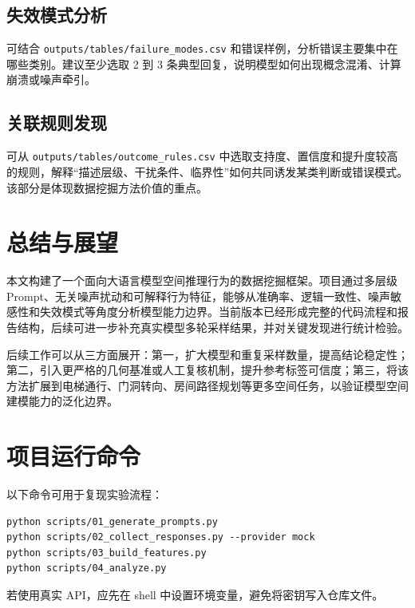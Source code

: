 \documentclass{BJUTReport}
\begin{document}
\subsection{失效模式分析}

可结合 \verb|outputs/tables/failure_modes.csv| 和错误样例，分析错误主要集中在哪些类别。建议至少选取 2 到 3 条典型回复，说明模型如何出现概念混淆、计算崩溃或噪声牵引。

\subsection{关联规则发现}

可从 \verb|outputs/tables/outcome_rules.csv| 中选取支持度、置信度和提升度较高的规则，解释“描述层级、干扰条件、临界性”如何共同诱发某类判断或错误模式。该部分是体现数据挖掘方法价值的重点。

\section{总结与展望}

本文构建了一个面向大语言模型空间推理行为的数据挖掘框架。项目通过多层级 Prompt、无关噪声扰动和可解释行为特征，能够从准确率、逻辑一致性、噪声敏感性和失效模式等角度分析模型能力边界。当前版本已经形成完整的代码流程和报告结构，后续可进一步补充真实模型多轮采样结果，并对关键发现进行统计检验。

后续工作可以从三方面展开：第一，扩大模型和重复采样数量，提高结论稳定性；第二，引入更严格的几何基准或人工复核机制，提升参考标签可信度；第三，将该方法扩展到电梯通行、门洞转向、房间路径规划等更多空间任务，以验证模型空间建模能力的泛化边界。

\clearpage{}

\nocite{*}

\appendix
{}

\section{项目运行命令}

以下命令可用于复现实验流程：

\begin{lstlisting}
python scripts/01_generate_prompts.py
python scripts/02_collect_responses.py --provider mock
python scripts/03_build_features.py
python scripts/04_analyze.py
\end{lstlisting}

若使用真实 API，应先在 shell 中设置环境变量，避免将密钥写入仓库文件。
\end{document}
